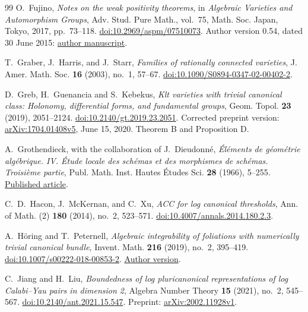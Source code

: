 \begin{thebibliography}{99}
O.~Fujino,
\emph{Notes on the weak positivity theorems},
in \emph{Algebraic Varieties and Automorphism Groups},
Adv. Stud. Pure Math., vol.~75,
Math. Soc. Japan, Tokyo, 2017, pp.~73--118.
\href{https://doi.org/10.2969/aspm/07510073}{doi:10.2969/aspm/07510073}.
Author version 0.54, dated 30 June 2015:
\href{https://www.math.kyoto-u.ac.jp/~fujino/weak-posi11.pdf}{author manuscript}.

T.~Graber, J.~Harris, and J.~Starr,
\emph{Families of rationally connected varieties},
J. Amer. Math. Soc. \textbf{16} (2003), no.~1, 57--67.
\href{https://doi.org/10.1090/S0894-0347-02-00402-2}{doi:10.1090/S0894-0347-02-00402-2}.

D.~Greb, H.~Guenancia and S.~Kebekus, \emph{Klt varieties with trivial
canonical class: Holonomy, differential forms, and fundamental groups},
Geom. Topol. \textbf{23} (2019), 2051--2124.
\href{https://doi.org/10.2140/gt.2019.23.2051}{doi:10.2140/gt.2019.23.2051}.
Corrected preprint version:
\href{https://arxiv.org/abs/1704.01408v5}{arXiv:1704.01408v5}, June 15, 2020.
Theorem B and Proposition D.

A.~Grothendieck, with the collaboration of J.~Dieudonn\'e,
\emph{\'El\'ements de g\'eom\'etrie alg\'ebrique. IV.
\'Etude locale des sch\'emas et des morphismes de sch\'emas.
Troisi\`eme partie},
Publ. Math. Inst. Hautes \'Etudes Sci. \textbf{28} (1966), 5--255.
\href{https://www.numdam.org/item/PMIHES_1966__28__5_0/}{Published article}.

C.~D.~Hacon, J.~McKernan, and C.~Xu,
\emph{ACC for log canonical thresholds},
Ann. of Math. (2) \textbf{180} (2014), no.~2, 523--571.
\href{https://doi.org/10.4007/annals.2014.180.2.3}{doi:10.4007/annals.2014.180.2.3}.

A.~H\"oring and T.~Peternell,
\emph{Algebraic integrability of foliations with numerically trivial canonical bundle},
Invent. Math. \textbf{216} (2019), no.~2, 395--419.
\href{https://doi.org/10.1007/s00222-018-00853-2}{doi:10.1007/s00222-018-00853-2}.
\href{https://math.univ-cotedazur.fr/~hoering/articles/a33-algebraic-integrability.pdf}{Author version}.

C.~Jiang and H.~Liu,
\emph{Boundedness of log pluricanonical representations of log Calabi--Yau
pairs in dimension 2},
Algebra Number Theory \textbf{15} (2021), no.~2, 545--567.
\href{https://doi.org/10.2140/ant.2021.15.547}{doi:10.2140/ant.2021.15.547}.
Preprint: \href{https://arxiv.org/abs/2002.11928v1}{arXiv:2002.11928v1}.


\end{thebibliography}
